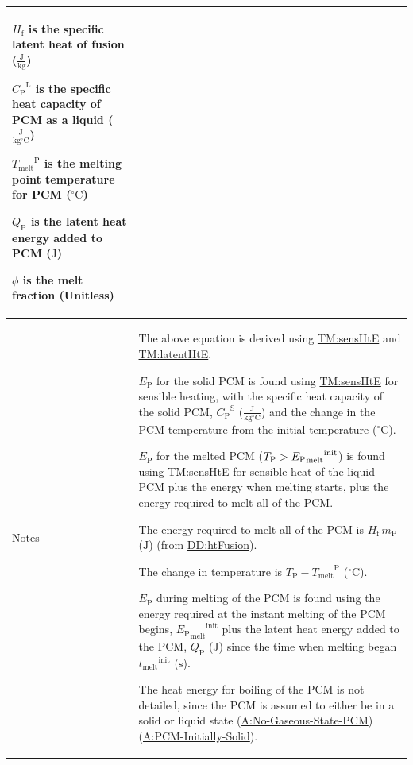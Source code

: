 \documentclass[12pt]{article}
\newcommand{\gt}{\ensuremath >}
\begin{document}
\begin{minipage}{\textwidth}
\begin{tabular}{>{\raggedright}p{}>{\raggedright\arraybackslash}p{}}
\begin{symbDescription}
              \item{${H_{\text{f}}}$ is the specific latent heat of fusion ($\frac{\text{J}}{\text{kg}}$)}
              \item{${{C_{\text{P}}}^{\text{L}}}$ is the specific heat capacity of PCM as a liquid ($\frac{\text{J}}{\text{kg}{}^{\circ}\text{C}}$)}
              \item{${{T_{\text{melt}}}^{\text{P}}}$ is the melting point temperature for PCM (${{}^{\circ}\text{C}}$)}
              \item{${Q_{\text{P}}}$ is the latent heat energy added to PCM (${\text{J}}$)}
              \item{$ϕ$ is the melt fraction (Unitless)}
              \end{symbDescription}
\\ \midrule
Notes & The above equation is derived using \hyperref[TM:sensHtE]{TM:sensHtE} and \hyperref[TM:latentHtE]{TM:latentHtE}.
        
        ${E_{\text{P}}}$ for the solid PCM is found using \hyperref[TM:sensHtE]{TM:sensHtE} for sensible heating, with the specific heat capacity of the solid PCM, ${{C_{\text{P}}}^{\text{S}}}$ ($\frac{\text{J}}{\text{kg}{}^{\circ}\text{C}}$) and the change in the PCM temperature from the initial temperature (${{}^{\circ}\text{C}}$).
        
        ${E_{\text{P}}}$ for the melted PCM (${T_{\text{P}}}\gt{}{{{E_{\text{P}}}_{\text{melt}}}^{\text{init}}}$) is found using \hyperref[TM:sensHtE]{TM:sensHtE} for sensible heat of the liquid PCM plus the energy when melting starts, plus the energy required to melt all of the PCM.
        
        The energy required to melt all of the PCM is ${H_{\text{f}}}\,{m_{\text{P}}}$ (${\text{J}}$) (from \hyperref[DD:htFusion]{DD:htFusion}).
        
        The change in temperature is ${T_{\text{P}}}-{{T_{\text{melt}}}^{\text{P}}}$ (${{}^{\circ}\text{C}}$).
        
        ${E_{\text{P}}}$ during melting of the PCM is found using the energy required at the instant melting of the PCM begins, ${{{E_{\text{P}}}_{\text{melt}}}^{\text{init}}}$ plus the latent heat energy added to the PCM, ${Q_{\text{P}}}$ (${\text{J}}$) since the time when melting began ${{t_{\text{melt}}}^{\text{init}}}$ (${\text{s}}$).
        
        The heat energy for boiling of the PCM is not detailed, since the PCM is assumed to either be in a solid or liquid state (\hyperref[assumpNGSP]{A:No-Gaseous-State-PCM}) (\hyperref[assumpPIS]{A:PCM-Initially-Solid}).
        

\end{tabular}
\end{minipage}
\end{document}
